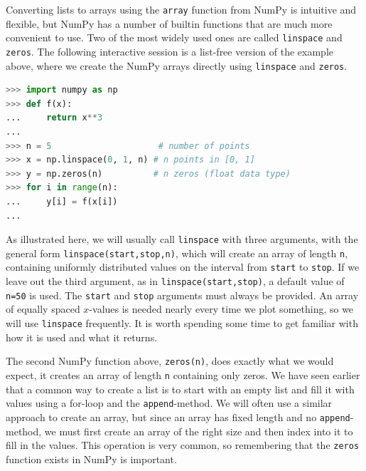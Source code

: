 \documentclass[graybox,envcountchap,sectrefs,final]{svmonodo}
\begin{document}
Converting lists to arrays using the \texttt{array} function from NumPy is intuitive and flexible, but NumPy has a number
of builtin functions that are much more convenient to use. Two of the most widely used ones are called \texttt{linspace}
and \texttt{zeros}.  The following interactive session is a list-free version of the example above, where we create
the NumPy arrays directly using \texttt{linspace} and \texttt{zeros}.
\begin{lstlisting}[language=Python,style=blue1]
>>> import numpy as np
>>> def f(x):
...     return x**3
...
>>> n = 5                     # number of points
>>> x = np.linspace(0, 1, n) # n points in [0, 1]
>>> y = np.zeros(n)          # n zeros (float data type)
>>> for i in range(n):
...     y[i] = f(x[i])
...
\end{lstlisting}
As illustrated here, we will usually call \texttt{linspace} with three arguments, with the general form
\texttt{linspace(start,stop,n)}, which will create an array of length \texttt{n}, containing uniformly distributed values on
the interval from \texttt{start} to \texttt{stop}. If we leave out the third argument, as in \texttt{linspace(start,stop)},
a default value of \texttt{n=50} is used. The \texttt{start} and \texttt{stop} arguments must always be provided. An array of equally
spaced $x$-values is needed nearly every time we plot something, so we will use \texttt{linspace} frequently. It is
worth spending some time to get familiar with how it is used and what it returns.

The second NumPy function above, \texttt{zeros(n)}, does exactly what we would expect, it creates an array of length \texttt{n}
containing only zeros. We have seen earlier that a common way to create a list is to start with an empty list
and fill it with values using a for-loop and the \texttt{append}-method. We will often use a similar approach to create
an array, but since an array has fixed length and no \texttt{append}-method, we must first create an array of the right size and
then index into it to fill in the values. This operation is very common, so remembering that the \texttt{zeros}
function exists in NumPy is important.
\end{document}
